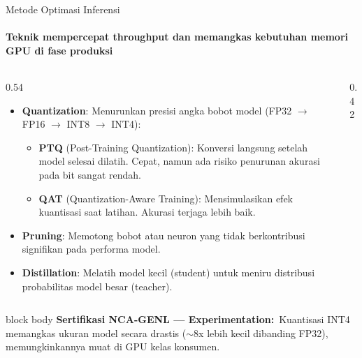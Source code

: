 \documentclass[aspectratio=169,t]{beamer}
\newcommand{\certnote}[2]{%
  \vspace{0.1em}
  \begin{beamercolorbox}[rounded=true,shadow=false,sep=4pt]{block body}
    {\scriptsize\color{nvblue}\textbf{Sertifikasi NCA-GENL --- #1:}}\,
    {\scriptsize\color{nvgray}#2}
  \end{beamercolorbox}%
}
\begin{document}
\begin{frame}{Metode Optimasi Inferensi}
  \framesubtitle{Teknik mempercepat throughput dan memangkas kebutuhan memori GPU di fase produksi}
  \begin{columns}[T]
    \begin{column}{0.54\textwidth}
      \begin{itemize}\footnotesize
        \item \textbf{Quantization}: Menurunkan presisi angka bobot model (FP32 $\to$ FP16 $\to$ INT8 $\to$ INT4):
          \begin{itemize}\scriptsize
            \item \textbf{PTQ} (Post-Training Quantization): Konversi langsung setelah model selesai dilatih. Cepat, namun ada risiko penurunan akurasi pada bit sangat rendah.
            \item \textbf{QAT} (Quantization-Aware Training): Mensimulasikan efek kuantisasi saat latihan. Akurasi terjaga lebih baik.
          \end{itemize}
        \item \textbf{Pruning}: Memotong bobot atau neuron yang tidak berkontribusi signifikan pada performa model.
        \item \textbf{Distillation}: Melatih model kecil (student) untuk meniru distribusi probabilitas model besar (teacher).
      \end{itemize}
    \end{column}
    \begin{column}{0.42\textwidth}
      \begin{center}
      \end{center}
    \end{column}
  \end{columns}
  \certnote{Experimentation}{Kuantisasi INT4 memangkas ukuran model secara drastis ($\sim$8x lebih kecil dibanding FP32), memungkinkannya muat di GPU kelas konsumen.}
\end{frame}
\end{document}
